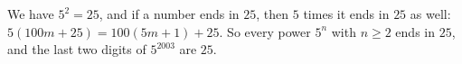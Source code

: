 We have $5^2=25$, and if a number ends in $25$, then $5$ times it ends in $25$ as well: $5(100m+25)=100(5m+1)+25$. So every power $5^n$ with $n\ge2$ ends in $25$, and the last two digits of $5^{2003}$ are $\boxed{25}$.
